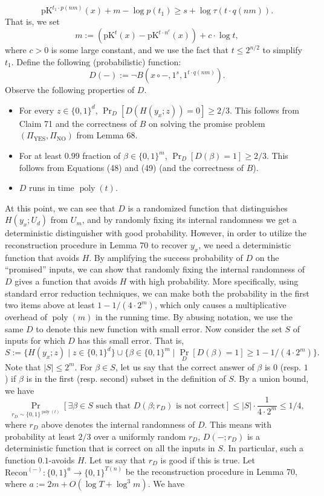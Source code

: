 \[\mathrm{pK}^{t_1\cdot p(nm)}(x)+m-\log p(t_1)\geq s+\log\tau(t\cdot q(nm)).\tag{49}\]
That is, we set
\[m:=(\mathrm{pK}^t(x)-\mathrm{pK}^{t\cdot n^c}(x))+c\cdot\log t,\]
where $c>0$ is some large constant, and we use the fact that $t\leq2^{n/2}$ to simplify $t_1$. Define the following (probabilistic) function:
\[D(-):=\neg B(x\circ-,1^s,1^{t\cdot q(nm)}).\]
Observe the following properties of $D$.
\begin{itemize}
\item For every $z\in\{0,1\}^d$, $\Pr_D[D(H(y_x;z))=0]\geq2/3$. This follows from Claim 71 and the correctness of $B$ on solving the promise problem $(\Pi_{\mathrm{YES}},\Pi_{\mathrm{NO}})$ from Lemma 68.
\item For at least $0.99$ fraction of $\beta\in\{0,1\}^m$, $\Pr_D[D(\beta)=1]\geq2/3$. This follows from Equations (48) and (49) (and the correctness of $B$).
\item $D$ runs in time $\operatorname{poly}(t)$.
\end{itemize}
At this point, we can see that $D$ is a randomized function that distinguishes $H(y_x;U_d)$ from $U_m$, and by randomly fixing its internal randomness we get a deterministic distinguisher with good probability. However, in order to utilize the reconstruction procedure in Lemma 70 to recover $y_x$, we need a deterministic function that avoids $H$. By amplifying the success probability of $D$ on the ``promised'' inputs, we can show that randomly fixing the internal randomness of $D$ gives a function that avoids $H$ with high probability. More specifically, using standard error reduction techniques, we can make both the probability in the first two items above at least $1-1/(4\cdot2^m)$, which only causes a multiplicative overhead of $\operatorname{poly}(m)$ in the running time. By abusing notation, we use the same $D$ to denote this new function with small error. Now consider the set $S$ of inputs for which $D$ has this small error. That is,
\[S:=\{H(y_x;z)\mid z\in\{0,1\}^d\}\cup\{\beta\in\{0,1\}^m\mid\Pr_D[D(\beta)=1]\geq1-1/(4\cdot2^m)\}.\]
Note that $|S|\leq2^m$. For $\beta\in S$, let us say that the correct answer of $\beta$ is $0$ (resp. $1$) if $\beta$ is in the first (resp. second) subset in the definition of $S$. By a union bound, we have
\[\Pr_{r_D\sim\{0,1\}^{\operatorname{poly}(t)}}[\exists\beta\in S\text{ such that }D(\beta;r_D)\text{ is not correct}]\leq|S|\cdot\frac1{4\cdot2^m}\leq1/4,\tag{50}\]
where $r_D$ above denotes the internal randomness of $D$. This means with probability at least $2/3$ over a uniformly random $r_D$, $D(-;r_D)$ is a deterministic function that is correct on all the inputs in $S$. In particular, such a function $0.1$-avoids $H$. Let us say that $r_D$ is good if this is true. Let $\mathrm{Recon}^{(-)}:\{0,1\}^a\to\{0,1\}^{T(n)}$ be the reconstruction procedure in Lemma 70, where $a:=2m+O(\log T+\log^3m)$. We have
